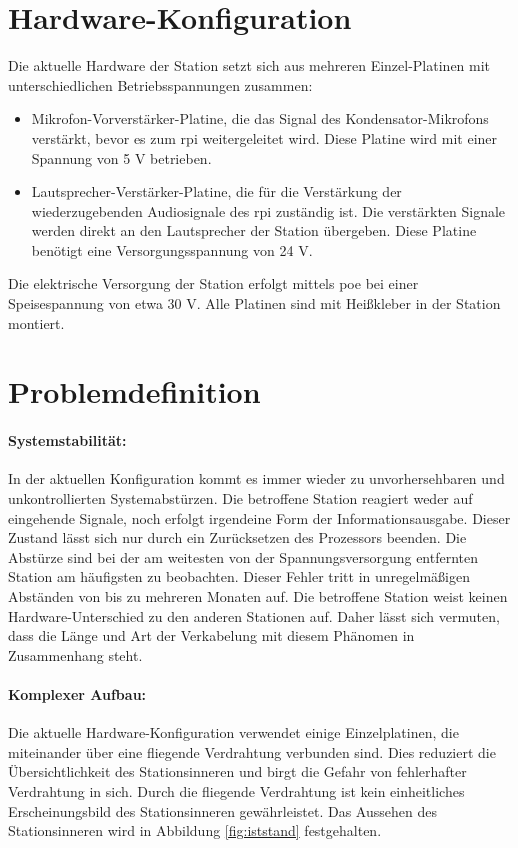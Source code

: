 \section{Hardware-Konfiguration}
Die aktuelle Hardware der Station setzt sich aus mehreren Einzel-Platinen mit unterschiedlichen Betriebsspannungen zusammen:
\begin{itemize}
    \item Mikrofon-Vorverstärker-Platine, die das Signal des Kondensator-Mikrofons verstärkt, bevor es zum \ac{rpi} weitergeleitet wird. Diese Platine wird mit einer Spannung von 5 V betrieben.
    \item Lautsprecher-Verstärker-Platine, die für die Verstärkung der wiederzugebenden Audiosignale des \ac{rpi} zuständig ist. Die verstärkten Signale werden direkt an den Lautsprecher der Station übergeben. Diese Platine benötigt eine Versorgungsspannung von 24 V.
\end{itemize}
Die elektrische Versorgung der Station erfolgt mittels \ac{poe} bei einer Speisespannung von etwa 30 V.
Alle Platinen sind mit Heißkleber in der Station montiert.

\section{Problemdefinition}
\paragraph{Systemstabilität:} %
In der aktuellen Konfiguration kommt es immer wieder zu unvorhersehbaren und unkontrollierten Systemabstürzen.
Die betroffene Station reagiert weder auf eingehende Signale, noch erfolgt irgendeine Form der Informationsausgabe.
Dieser Zustand lässt sich nur durch ein Zurücksetzen des Prozessors beenden.
Die Abstürze sind bei der am weitesten von der Spannungsversorgung entfernten Station am häufigsten zu beobachten.
Dieser Fehler tritt in unregelmäßigen Abständen von bis zu mehreren Monaten auf.
Die betroffene Station weist keinen Hardware-Unterschied zu den anderen Stationen auf.
Daher lässt sich vermuten, dass die Länge und Art der Verkabelung mit diesem Phänomen in Zusammenhang steht.

\paragraph{Komplexer Aufbau:} %
Die aktuelle Hardware-Konfiguration verwendet einige Einzelplatinen, die miteinander über eine fliegende Verdrahtung verbunden sind.
Dies reduziert die Übersichtlichkeit des Stationsinneren und birgt die Gefahr von fehlerhafter Verdrahtung in sich.
Durch die fliegende Verdrahtung ist kein einheitliches Erscheinungsbild des Stationsinneren gewährleistet.
Das Aussehen des Stationsinneren wird in Abbildung \ref{fig:iststand} festgehalten.

